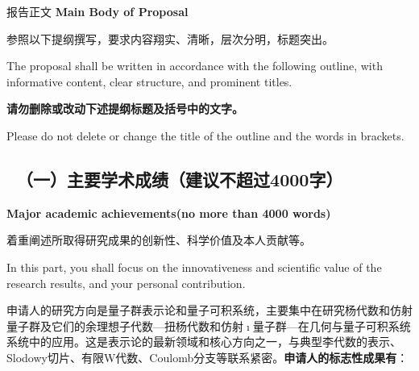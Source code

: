 \documentclass[12pt,UTF8,AutoFakeBold=4,a4paper]{ctexart}
\begin{document}
\begin{center}
{\sanhao {} 报告正文 
\bfseries {} Main Body of Proposal}
\end{center}

{\sihao \kaishu  
参照以下提纲撰写，要求内容翔实、清晰，层次分明，标题突出。}

\bigskip

{\sihao {} The proposal shall be written in accordance with the following outline, with informative content, clear structure, and prominent titles.}

\bigskip

{\sihao \kaishu \color{MsBlue} \bfseries 请勿删除或改动下述提纲标题及括号中的文字。}

\bigskip

{\sihao \color{MsBlue}  Please do not delete or change the title of the outline and the words in brackets.}



{\color{MsBlue} \subsection{\sihao \kaishu \qquad \ 
\textbf{（一）主要学术成绩}{\normalfont（建议不超过4000字）}}}


{\color{MsBlue} \xiaosihao {} 
\textbf{Major academic achievements(no more than 4000 words)}}

\medskip

{\sihao \kaishu \color{MsBlue} 着重阐述所取得研究成果的创新性、科学价值及本人贡献等。}

\medskip

{\color{MsBlue} \xiaosihao {} In this part, you shall focus on the innovativeness and scientific value of the research results, and your personal contribution.}

% 
% 


申请人的研究方向是量子群表示论和量子可积系统，主要集中在研究杨代数和仿射量子群及它们的余理想子代数---扭杨代数和仿射$\imath$量子群---在几何与量子可积系统系统中的应用。这是表示论的最新领域和核心方向之一，与典型李代数的表示、Slodowy切片、有限W代数、Coulomb分支等联系紧密。\textbf{申请人的标志性成果有}：
\end{document}

